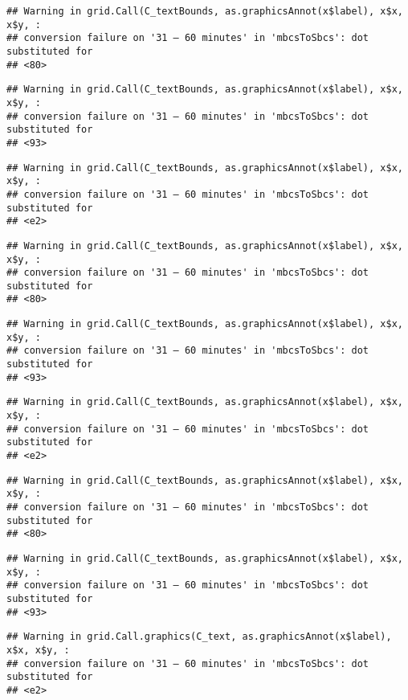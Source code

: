 \documentclass[
]{article}
\begin{document}
\begin{verbatim}
## Warning in grid.Call(C_textBounds, as.graphicsAnnot(x$label), x$x, x$y, :
## conversion failure on '31 – 60 minutes' in 'mbcsToSbcs': dot substituted for
## <80>
\end{verbatim}

\begin{verbatim}
## Warning in grid.Call(C_textBounds, as.graphicsAnnot(x$label), x$x, x$y, :
## conversion failure on '31 – 60 minutes' in 'mbcsToSbcs': dot substituted for
## <93>
\end{verbatim}

\begin{verbatim}
## Warning in grid.Call(C_textBounds, as.graphicsAnnot(x$label), x$x, x$y, :
## conversion failure on '31 – 60 minutes' in 'mbcsToSbcs': dot substituted for
## <e2>
\end{verbatim}

\begin{verbatim}
## Warning in grid.Call(C_textBounds, as.graphicsAnnot(x$label), x$x, x$y, :
## conversion failure on '31 – 60 minutes' in 'mbcsToSbcs': dot substituted for
## <80>
\end{verbatim}

\begin{verbatim}
## Warning in grid.Call(C_textBounds, as.graphicsAnnot(x$label), x$x, x$y, :
## conversion failure on '31 – 60 minutes' in 'mbcsToSbcs': dot substituted for
## <93>
\end{verbatim}

\begin{verbatim}
## Warning in grid.Call(C_textBounds, as.graphicsAnnot(x$label), x$x, x$y, :
## conversion failure on '31 – 60 minutes' in 'mbcsToSbcs': dot substituted for
## <e2>
\end{verbatim}

\begin{verbatim}
## Warning in grid.Call(C_textBounds, as.graphicsAnnot(x$label), x$x, x$y, :
## conversion failure on '31 – 60 minutes' in 'mbcsToSbcs': dot substituted for
## <80>
\end{verbatim}

\begin{verbatim}
## Warning in grid.Call(C_textBounds, as.graphicsAnnot(x$label), x$x, x$y, :
## conversion failure on '31 – 60 minutes' in 'mbcsToSbcs': dot substituted for
## <93>
\end{verbatim}

\begin{verbatim}
## Warning in grid.Call.graphics(C_text, as.graphicsAnnot(x$label), x$x, x$y, :
## conversion failure on '31 – 60 minutes' in 'mbcsToSbcs': dot substituted for
## <e2>
\end{verbatim}
\end{document}
